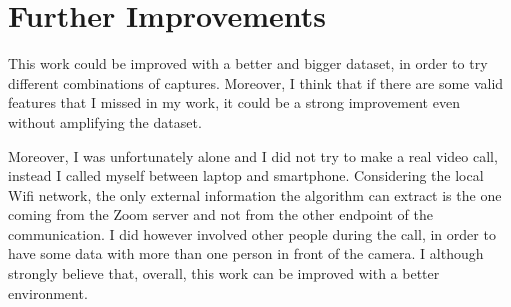 \section{Further Improvements}

This work could be improved with a better and bigger dataset, in order to try different combinations of captures. Moreover, I think that if there are some valid features that I missed in my work, it could be a strong improvement even without amplifying the dataset.

Moreover, I was unfortunately alone and I did not try to make a real video call, instead I called myself between laptop and smartphone. Considering the local Wifi network, the only external information the algorithm can extract is the one coming from the Zoom server and not from the other endpoint of the communication. I did however involved other people during the call, in order to have some data with more than one person in front of the camera. I although strongly believe that, overall, this work can be improved with a better environment.